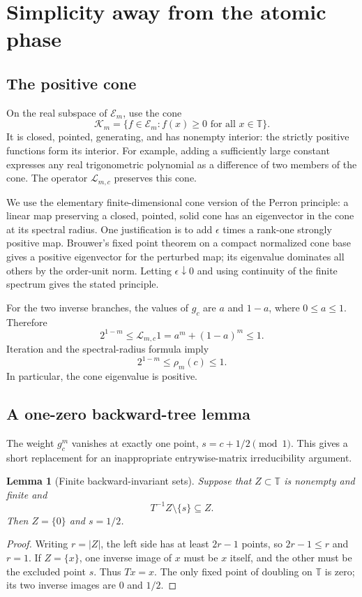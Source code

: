 \documentclass[11pt,a4paper]{article}
\numberwithin{equation}{section}
\newtheorem{lemma}[lemma]{Lemma}
\theoremstyle{definition}
\theoremstyle{remark}
\newcommand{\TT}{\mathbb T}
\newcommand{\Lop}{\mathcal L}
\begin{document}
\section{Simplicity away from the atomic phase}
\label{sec:perron}

\subsection{The positive cone}
On the real subspace of $\mathcal E_m$, use the cone
\[
 \mathcal K_m=\{f\in\mathcal E_m:f(x)\geq0\text{ for all }x\in\TT\}.
\]
It is closed, pointed, generating, and has nonempty interior: the strictly
positive functions form its interior. For example, adding a sufficiently
large constant expresses any real trigonometric polynomial as a
difference of two members of the cone. The operator $\Lop_{m,c}$
preserves this cone.

We use the elementary finite-dimensional cone version of the Perron
principle: a linear map preserving a closed, pointed, solid cone has an
eigenvector in the cone at its spectral radius. One justification is to
add $\epsilon$ times a rank-one strongly positive map. Brouwer's fixed
point theorem on a compact normalized cone base gives a positive
eigenvector for the perturbed map; its eigenvalue dominates all others
by the order-unit norm. Letting $\epsilon\downarrow0$ and using continuity
of the finite spectrum gives the stated principle.

For the two inverse branches, the values of $g_c$ are $a$ and $1-a$,
where $0\leq a\leq1$. Therefore
\begin{equation}
 2^{1-m}\leq\Lop_{m,c}1=a^m+(1-a)^m\leq1.
 \label{eq:row-bound}
\end{equation}
Iteration and the spectral-radius formula imply
\begin{equation}
 2^{1-m}\leq\rho_m(c)\leq1.
 \label{eq:rho-bounds}
\end{equation}
In particular, the cone eigenvalue is positive.

\subsection{A one-zero backward-tree lemma}
The weight $g_c^m$ vanishes at exactly one point,
$s=c+1/2\pmod1$. This gives a short replacement for an inappropriate
entrywise-matrix irreducibility argument.

\begin{lemma}[Finite backward-invariant sets]
\label{lem:tree}
Suppose that $Z\subset\TT$ is nonempty and finite and
\[
 T^{-1}Z\setminus\{s\}\subseteq Z.
\]
Then $Z=\{0\}$ and $s=1/2$.
\end{lemma}
\begin{proof}
Writing $r=|Z|$, the left side has at least $2r-1$ points, so
$2r-1\leq r$ and $r=1$. If $Z=\{x\}$, one inverse image of $x$
must be $x$ itself, and the other must be the excluded point $s$.
Thus $Tx=x$. The only fixed point of doubling on $\TT$ is zero;
its two inverse images are $0$ and $1/2$.
\end{proof}
\end{document}
